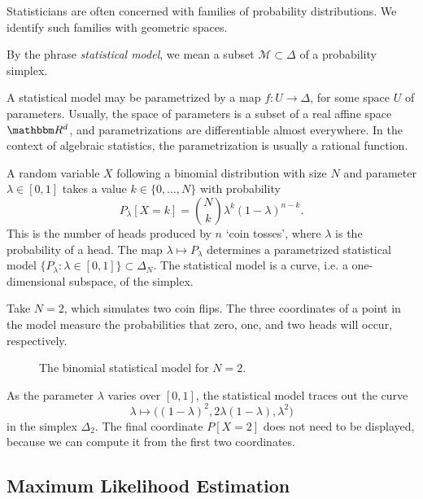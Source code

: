\documentclass[11pt,titlepage]{article}
\newcommand*{\Mod}{\mathcal{M}}
\numberwithin{equation}{section}
\begin{document}
    Statisticians are often concerned with families of probability
    distributions.  We identify such families with geometric spaces.
    \begin{definition}
    By the phrase \emph{statistical model}, we mean a subset $\Mod \subset
    \Delta$ of a probability simplex.
    \end{definition}
    \noindent A statistical model may be parametrized by a map $f: U \to
    \Delta$, for some space $U$ of parameters.  Usually, the space of parameters
    is a subset of a real affine space $\R^d$, and parametrizations are
    differentiable almost everywhere.  In the context of algebraic statistics,
    the parametrization is usually a rational function.
    \begin{example}
    A random variable $X$ following a binomial distribution with size $N$ and
    parameter $\lambda \in [0,1]$ takes a value $k \in \{0,\ldots, N\}$ with
    probability
    \[
        P_\lambda[X = k] = {N \choose k} \lambda^k(1-\lambda)^{n-k}.
    \]
    This is the number of heads produced by $n$ `coin tosses', where $\lambda$
    is the probability of a head.  The map $\lambda \mapsto P_\lambda$
    determines a parametrized statistical model $\{P_\lambda : \lambda \in [0,1]
    \} \subset \Delta_N$. The statistical model is a curve, i.e. a
    one-dimensional subspace, of the simplex.  

    Take $N=2$, which simulates two coin flips.  The three coordinates of a
    point in the model measure the probabilities that zero, one, and two heads
    will occur, respectively.
    \begin{figure}[H]\label{fig:binomial}
        \centering
        \vspace*{-0.2cm}
        \vspace*{-0.5cm}
        \caption{The binomial statistical model for $N=2$.}
    \end{figure}
    \noindent As the parameter $\lambda$ varies over $[0,1]$, the statistical
    model traces out the curve 
    \[
        \lambda \longmapsto \big((1-\lambda)^2, 2\lambda(1-\lambda), \lambda^2\big)
    \]
    in the simplex $\Delta_2$.  The final coordinate
    $P[X=2]$ does not need to be displayed, because we can compute it from the
    first two coordinates.  
    \end{example}
    
\subsection{Maximum Likelihood Estimation}
\end{document}
